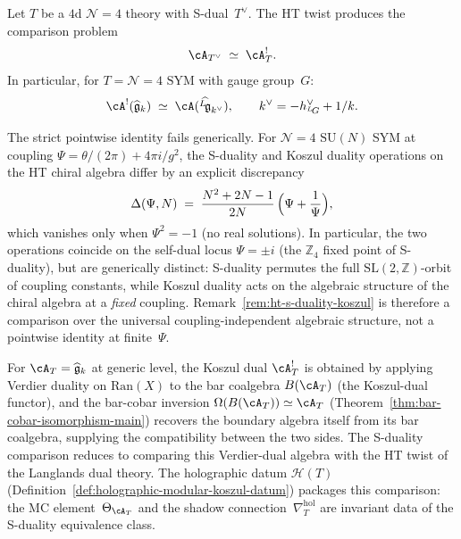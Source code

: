 \begin{remark}
\label{rem:ht-s-duality-koszul}
Let $T$ be a $4$d $\mathcal{N}=4$ theory with S-dual~$T^\vee$.
The HT twist produces the comparison problem
\begin{equation}\label{eq:ht-s-duality-koszul}
\cA_{T^\vee} \;\simeq\; \cA_T^!.
\end{equation}
In particular, for $T = \mathcal{N}=4$ $\mathrm{SYM}$ with gauge group~$G$:
\begin{equation}\label{eq:ht-langlands-koszul}
\cA^!(\widehat{\mathfrak{g}}_k)
\;\simeq\;
\cA(\widehat{{}^L\!\mathfrak{g}}_{k^\vee}),
\qquad
k^\vee = -h^\vee_{{}^L\!G} + 1/k.
\end{equation}
\end{remark}

\begin{remark}
\label{rem:ht-s-duality-discrepancy}
The strict pointwise identity fails generically.
For $\mathcal{N}=4$ $\mathrm{SU}(N)$ SYM at coupling $\Psi = \theta/(2\pi) + 4\pi i/g^2$,
the S-duality and Koszul duality operations on the HT chiral algebra
differ by an explicit discrepancy
\[
 \Delta(\Psi, N)
 \;=\;
 \frac{N^2 + 2N - 1}{2N}\,\Bigl(\Psi + \frac{1}{\Psi}\Bigr),
\]
which vanishes only when $\Psi^2 = -1$ (no real solutions).
In particular, the two operations coincide on the self-dual locus
$\Psi = \pm i$ (the $\mathbb{Z}_4$ fixed point of S-duality),
but are generically distinct: S-duality permutes the full
$\mathrm{SL}(2,\mathbb{Z})$-orbit of coupling constants,
while Koszul duality acts on the algebraic structure of the
chiral algebra at a \emph{fixed} coupling.
Remark~\ref{rem:ht-s-duality-koszul} is therefore a comparison over
the universal coupling-independent algebraic structure, not a
pointwise identity at finite~$\Psi$.
\end{remark}

\begin{remark}
\label{rem:ht-s-duality-proved}
For $\cA_T = \widehat{\mathfrak{g}}_k$ at generic level, the Koszul
dual $\cA_T^!$ is obtained by applying Verdier duality on
$\mathrm{Ran}(X)$ to the bar coalgebra $B(\cA_T)$ (the Koszul-dual
functor), and the bar-cobar inversion
$\Omega(B(\cA_T)) \simeq \cA_T$
(Theorem~\ref{thm:bar-cobar-isomorphism-main}) recovers the boundary
algebra itself from its bar coalgebra, supplying the compatibility
between the two sides. The S-duality
comparison reduces to comparing this Verdier-dual algebra with the
HT twist of the Langlands dual theory. The holographic datum
$\mathcal{H}(T)$
(Definition~\ref{def:holographic-modular-koszul-datum}) packages
this comparison: the MC element~$\Theta_{\cA_T}$ and the shadow
connection~$\nabla^{\mathrm{hol}}_T$ are invariant data of the
S-duality equivalence class.
\end{remark}

